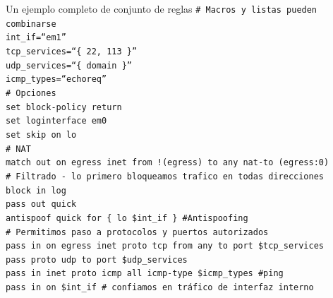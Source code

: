 \documentclass{beamer}
\begin{document}
\begin{frame}
\vspace{-0.4cm}

\begin{block}{Un ejemplo completo de conjunto de reglas}
\footnotesize
\tt \# Macros y listas pueden combinarse \\
\alert{int\_if=``em1''} \\
\alert{tcp\_services=``\{ 22, 113 \}''} \\
\alert{udp\_services=``\{ domain \}''} \\
\alert{icmp\_types=``echoreq''} \\

\# Opciones \\

\alert{set block-policy return} \\
\alert{set loginterface em0} \\
\alert{set skip on lo} \\

\# NAT \\
\alert{match out on egress inet from !(egress) to any nat-to (egress:0)} \\

\# Filtrado - lo primero bloqueamos trafico en todas direcciones \\
\alert{block in log} \\
\alert{pass out quick} \\

\alert{antispoof quick for \{ lo \$int\_if \}} \#Antispoofing \\

\# Permitimos paso a protocolos y puertos autorizados \\
\alert{pass in on egress inet proto tcp from any to port \$tcp\_services} \\   
\alert{pass proto udp to port \$udp\_services} \\

\alert{pass in inet proto icmp all icmp-type \$icmp\_types} \#ping \\

\alert{pass in on \$int\_if} \# confiamos en tráfico de interfaz interno

\end{block}

\end{frame}


\end{document}
